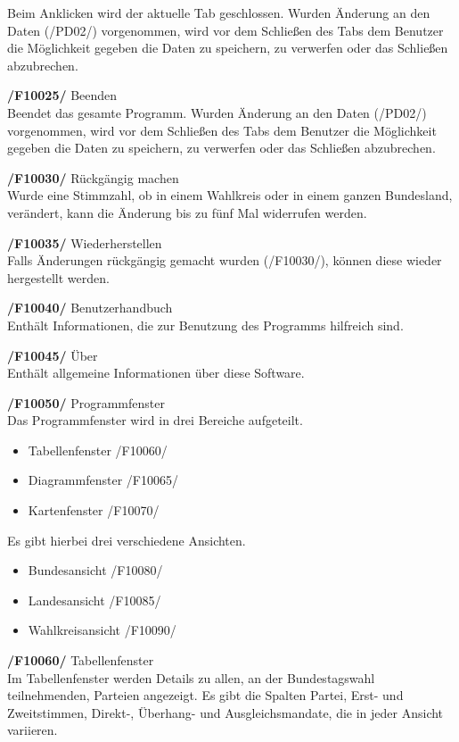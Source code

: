 \documentclass[10pt,a4paper]{article}
\begin{document}
\begin{list}{\quad}{}
	Beim Anklicken wird der aktuelle Tab geschlossen. Wurden Änderung an den Daten (/PD02/) vorgenommen, wird vor dem Schließen des Tabs dem Benutzer die Möglichkeit gegeben die Daten zu speichern, zu verwerfen oder das Schließen abzubrechen.
	\item \textbf{/F10025/} Beenden \hfill \\
	Beendet das gesamte Programm. Wurden Änderung an den Daten (/PD02/) vorgenommen, wird vor dem Schließen des Tabs dem Benutzer die Möglichkeit gegeben die Daten zu speichern, zu verwerfen oder das Schließen abzubrechen.
	\item \textbf{/F10030/} Rückgängig machen \hfill \\
	Wurde eine Stimmzahl, ob in einem Wahlkreis oder in einem ganzen Bundesland, verändert, kann die Änderung bis zu fünf Mal widerrufen werden.
	\item \textbf{/F10035/} Wiederherstellen \hfill \\
	Falls Änderungen rückgängig gemacht wurden (/F10030/), können diese wieder hergestellt werden.
	\item \textbf{/F10040/} Benutzerhandbuch \hfill \\
	Enthält Informationen, die zur Benutzung des Programms hilfreich sind.
	\item \textbf{/F10045/} Über \hfill \\
	Enthält allgemeine Informationen über diese Software.
	\item \textbf{/F10050/} Programmfenster \hfill \\
	Das Programmfenster wird in drei Bereiche aufgeteilt.
	\begin{itemize}
		\item Tabellenfenster /F10060/
		\item Diagrammfenster /F10065/
		\item Kartenfenster /F10070/
	\end{itemize}
	Es gibt hierbei drei verschiedene Ansichten.
	\begin{itemize}
		\item Bundesansicht /F10080/
		\item Landesansicht /F10085/
		\item Wahlkreisansicht /F10090/
	\end{itemize}
	\item \textbf{/F10060/} Tabellenfenster \hfill \\
	Im Tabellenfenster werden Details zu allen, an der Bundestagswahl teilnehmenden, Parteien angezeigt.
	Es gibt die Spalten Partei, Erst- und Zweitstimmen, Direkt-, Überhang- und Ausgleichsmandate, die in jeder Ansicht variieren. \hfill \\

\end{list}
\end{document}
